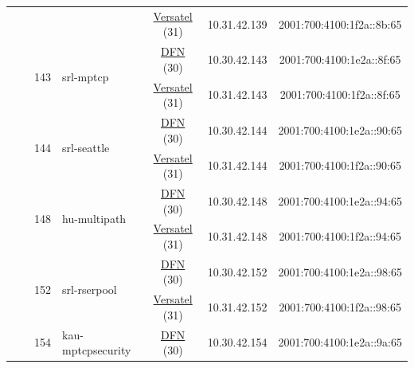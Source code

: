 \begin{small}
\begin{center}
\begin{longtable}{|c|c|c|c|c|c|c|c|}
  &  &  &  & \multicolumn{2}{|c|}{\tiny{\href{http://www.versatel.de}{Versatel} (31)}} & \tiny{10.31.42.139} & \tiny{2001:700:4100:1f2a::8b:65} \\* \cline{3-3}\cline{4-4}\cline{5-5}\cline{6-6}\cline{7-7}\cline{8-8}
  &  & \multirow{2}{*}{\tiny{143}} & \multicolumn{1}{|l|}{\multirow{2}{*}{\tiny{srl-mptcp}}} & \multicolumn{2}{|c|}{\tiny{\href{https://www.dfn.de}{DFN} (30)}} & \tiny{10.30.42.143} & \tiny{2001:700:4100:1e2a::8f:65} \\* \cline{5-5}\cline{6-6}\cline{7-7}\cline{8-8}
  &  &  &  & \multicolumn{2}{|c|}{\tiny{\href{http://www.versatel.de}{Versatel} (31)}} & \tiny{10.31.42.143} & \tiny{2001:700:4100:1f2a::8f:65} \\* \cline{3-3}\cline{4-4}\cline{5-5}\cline{6-6}\cline{7-7}\cline{8-8}
  &  & \multirow{2}{*}{\tiny{144}} & \multicolumn{1}{|l|}{\multirow{2}{*}{\tiny{srl-seattle}}} & \multicolumn{2}{|c|}{\tiny{\href{https://www.dfn.de}{DFN} (30)}} & \tiny{10.30.42.144} & \tiny{2001:700:4100:1e2a::90:65} \\* \cline{5-5}\cline{6-6}\cline{7-7}\cline{8-8}
  &  &  &  & \multicolumn{2}{|c|}{\tiny{\href{http://www.versatel.de}{Versatel} (31)}} & \tiny{10.31.42.144} & \tiny{2001:700:4100:1f2a::90:65} \\* \cline{3-3}\cline{4-4}\cline{5-5}\cline{6-6}\cline{7-7}\cline{8-8}
  &  & \multirow{2}{*}{\tiny{148}} & \multicolumn{1}{|l|}{\multirow{2}{*}{\tiny{hu-multipath}}} & \multicolumn{2}{|c|}{\tiny{\href{https://www.dfn.de}{DFN} (30)}} & \tiny{10.30.42.148} & \tiny{2001:700:4100:1e2a::94:65} \\* \cline{5-5}\cline{6-6}\cline{7-7}\cline{8-8}
  &  &  &  & \multicolumn{2}{|c|}{\tiny{\href{http://www.versatel.de}{Versatel} (31)}} & \tiny{10.31.42.148} & \tiny{2001:700:4100:1f2a::94:65} \\* \cline{3-3}\cline{4-4}\cline{5-5}\cline{6-6}\cline{7-7}\cline{8-8}
  &  & \multirow{2}{*}{\tiny{152}} & \multicolumn{1}{|l|}{\multirow{2}{*}{\tiny{srl-rserpool}}} & \multicolumn{2}{|c|}{\tiny{\href{https://www.dfn.de}{DFN} (30)}} & \tiny{10.30.42.152} & \tiny{2001:700:4100:1e2a::98:65} \\* \cline{5-5}\cline{6-6}\cline{7-7}\cline{8-8}
  &  &  &  & \multicolumn{2}{|c|}{\tiny{\href{http://www.versatel.de}{Versatel} (31)}} & \tiny{10.31.42.152} & \tiny{2001:700:4100:1f2a::98:65} \\* \cline{3-3}\cline{4-4}\cline{5-5}\cline{6-6}\cline{7-7}\cline{8-8}
  &  & \multirow{2}{*}{\tiny{154}} & \multicolumn{1}{|l|}{\multirow{2}{*}{\tiny{kau-mptcpsecurity}}} & \multicolumn{2}{|c|}{\tiny{\href{https://www.dfn.de}{DFN} (30)}} & \tiny{10.30.42.154} & \tiny{2001:700:4100:1e2a::9a:65} \\* \cline{5-5}\cline{6-6}\cline{7-7}\cline{8-8}

\end{longtable}
\end{center}
\end{small}
